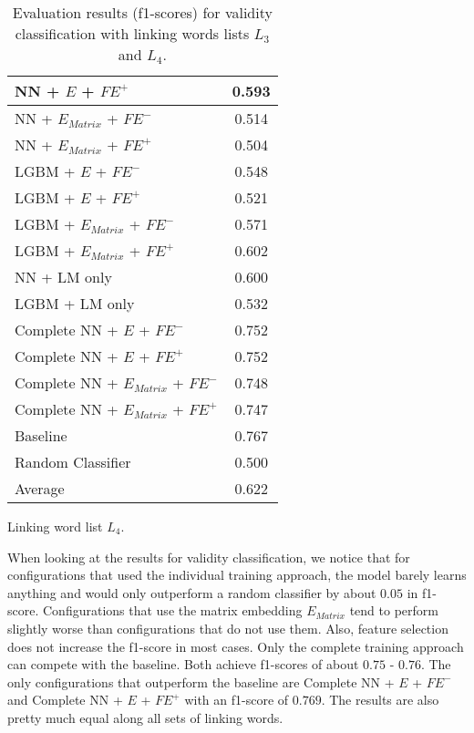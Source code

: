 \begin{table}[h]
\begin{subtable}{.5\textwidth}
\begin{tabular}{|| l || c ||}
 			NN + $E$ + $\textit{FE}^+$ & 0.593 \\
 			\hline
 			NN + $E_{Matrix}$ + $\textit{FE}^-$ & 0.514 \\
 			\hline
 			NN + $E_{Matrix}$ + $\textit{FE}^+$ & 0.504 \\
 			\hline
 			LGBM + $E$ + $\textit{FE}^-$ & 0.548 \\
 			\hline
 			LGBM + $E$ + $\textit{FE}^+$ & 0.521 \\
 			\hline
 			LGBM + $E_{Matrix}$ + $\textit{FE}^-$ & 0.571 \\
 			\hline
 			LGBM + $E_{Matrix}$ + $\textit{FE}^+$ & 0.602 \\
 			\hline
 			NN + LM only & 0.600 \\
 			\hline
 			LGBM + LM only & 0.532 \\
 			\hline
 			Complete NN + $E$ + $\textit{FE}^-$ & 0.752 \\
 			\hline
 			Complete NN + $E$ + $\textit{FE}^+$ & 0.752 \\
 			\hline
 			Complete NN + $E_{Matrix}$ + $\textit{FE}^-$ & 0.748 \\
 			\hline
 			Complete NN + $E_{Matrix}$ + $\textit{FE}^+$ & 0.747 \\
 			\hline
 			Baseline & 0.767 \\
 			\hline
 			Random Classifier & 0.500 \\
 			\hline
 			\hline
 			Average & 0.622 \\
 			\hline
		\end{tabular}
		\renewcommand{\arraystretch}{1}
  		\caption{Linking word list $L_4$.}%
  	\end{subtable}
  	\caption{Evaluation results (f1-scores) for validity classification with linking words lists $L_3$ and $L_4$.}%
  	\label{fig:validityresults2}
\end{table}

When looking at the results for validity classification, we notice that for configurations that used the individual training approach, the model barely learns anything and would only outperform a random classifier by about $0.05$ in f1-score. Configurations that use the matrix embedding $E_{Matrix}$ tend to perform slightly worse than configurations that do not use them. Also, feature selection does not increase the f1-score in most cases. Only the complete training approach can compete with the baseline. Both achieve f1-scores of about $0.75$ - $0.76$. The only configurations that outperform the baseline are 
Complete NN + $E$ + $\textit{FE}^-$ and Complete NN + $E$ + $\textit{FE}^+$ with an f1-score of $0.769$. The results are also pretty much equal along all sets of linking words.

